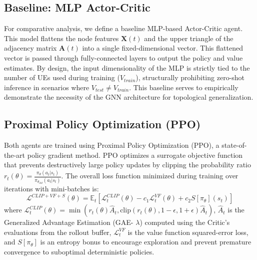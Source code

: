 \subsection{Baseline: MLP Actor-Critic}
For comparative analysis, we define a baseline MLP-based Actor-Critic agent. This model flattens the node features $\mathbf{X}(t)$ and the upper triangle of the adjacency matrix $\mathbf{A}(t)$ into a single fixed-dimensional vector. This flattened vector is passed through fully-connected layers to output the policy and value estimates. By design, the input dimensionality of the MLP is strictly tied to the number of UEs used during training ($V_{train}$), structurally prohibiting zero-shot inference in scenarios where $V_{test} \neq V_{train}$. This baseline serves to empirically demonstrate the necessity of the GNN architecture for topological generalization.

\subsection{Proximal Policy Optimization (PPO)}
Both agents are trained using Proximal Policy Optimization (PPO), a state-of-the-art policy gradient method. PPO optimizes a surrogate objective function that prevents destructively large policy updates by clipping the probability ratio $r_t(\theta) = \frac{\pi_\theta(a_t|s_t)}{\pi_{\theta_{old}}(a_t|s_t)}$. 
The overall loss function minimized during training over iterations with mini-batches is:
\begin{equation}
    \mathcal{L}^{CLIP+VF+S}(\theta) = \mathbb{E}_t \left[ \mathcal{L}^{CLIP}_t(\theta) - c_1 \mathcal{L}^{VF}_t(\theta) + c_2 S[\pi_\theta](s_t) \right]
\end{equation}
where $\mathcal{L}^{CLIP}_t(\theta) = \min(r_t(\theta)\hat{A}_t, \text{clip}(r_t(\theta), 1-\epsilon, 1+\epsilon)\hat{A}_t)$, $\hat{A}_t$ is the Generalized Advantage Estimation (GAE- $\lambda$) computed using the Critic's evaluations from the rollout buffer, $\mathcal{L}^{VF}_t$ is the value function squared-error loss, and $S[\pi_\theta]$ is an entropy bonus to encourage exploration and prevent premature convergence to suboptimal deterministic policies.
